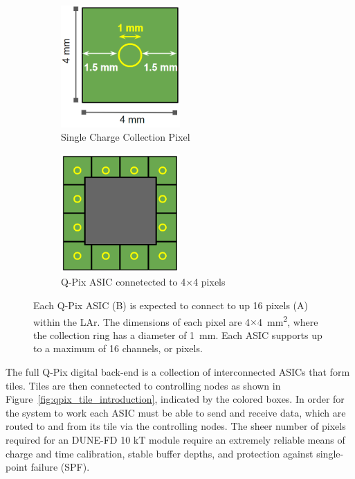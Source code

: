 \begin{figure}[]
\centering
\begin{subfigure}{.5\textwidth}
  \centering
  \includegraphics[width=0.5\textwidth]{images/single_pixel_dimensions_qpix.png}
  \caption{Single Charge Collection Pixel}
\end{subfigure}%
\begin{subfigure}{.5\textwidth}
  \centering
  \includegraphics[width=0.5\textwidth]{images/single_asic_dimensions_qpix.png}
  \caption{Q-Pix ASIC connetected to 4$\times$4 pixels}
\end{subfigure}
\caption{Each Q-Pix ASIC (B) is expected to connect to up 16 pixels (A) within the LAr.
The dimensions of each pixel are 4$\times$4~\unit{mm^2}, where the collection ring has a diameter of 1~\unit{mm}.
Each ASIC supports up to a maximum of 16 channels, or pixels.
}
\label{fig:qpix_asic_introduction}
\end{figure}

The full Q-Pix digital back-end is a collection of interconnected ASICs that form tiles.
Tiles are then connetected to controlling nodes as shown in Figure~\ref{fig:qpix_tile_introduction}, indicated by the colored boxes.
In order for the system to work each ASIC must be able to send and receive data, which are routed to and from its tile via the controlling nodes.
The sheer number of pixels required for an DUNE-FD 10 kT module require an extremely reliable means of charge and time calibration, stable buffer depths, and protection against single-point failure (SPF).

